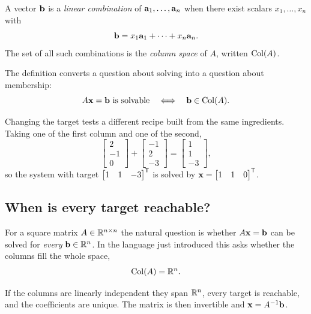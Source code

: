 \begin{definition}
A vector \(\mathbf{b}\) is a \emph{linear combination} of
\(\mathbf{a}_1,\ldots,\mathbf{a}_n\) when there exist scalars \(x_1,\ldots,x_n\)
with
\[
	\mathbf{b}=x_1\mathbf{a}_1+\cdots+x_n\mathbf{a}_n .
\]
The set of all such combinations is the \emph{column space} of \(A\), written
\(\operatorname{Col}(A)\).
\end{definition}

The definition converts a question about solving into a question about
membership:
\[
	A\vect{x}=\vect{b}\ \text{is solvable}
	\quad\Longleftrightarrow\quad
	\vect{b}\in\Col(A).
\]


Changing the target tests a different recipe built from the same ingredients.
Taking one of the first column and one of the second,
\[
	\begin{bmatrix}2\\-1\\0\end{bmatrix}
	+\begin{bmatrix}-1\\2\\-3\end{bmatrix}
	=\begin{bmatrix}1\\1\\-3\end{bmatrix},
\]
so the system with target \(\begin{bmatrix}1&1&-3\end{bmatrix}^{\mathsf{T}}\) is solved by
\(\mathbf{x}=\begin{bmatrix}1&1&0\end{bmatrix}^{\mathsf{T}}\).

\subsection{When is every target reachable?}

For a square matrix \(A\in\mathbb{R}^{n\times n}\) the natural question is whether
\(A\mathbf{x}=\mathbf{b}\) can be solved for \emph{every} \(\mathbf{b}\in\mathbb{R}^{n}\). In
the language just introduced this asks whether the columns fill the whole space,
\[
	\operatorname{Col}(A)=\mathbb{R}^{n}.
\]

If the columns are linearly independent they span \(\mathbb{R}^{n}\), every target is
reachable, and the coefficients are unique. The matrix is then invertible and
\(\mathbf{x}=A^{-1}\mathbf{b}\).

